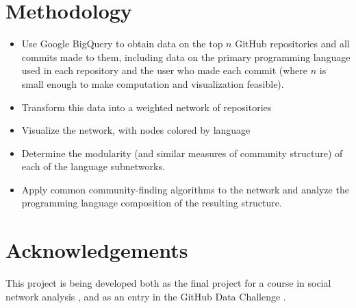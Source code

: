 \documentclass[twocolumn]{article}
\begin{document}
\section*{Methodology}
\begin{itemize}
    \item Use Google BigQuery to obtain data on the top $n$ GitHub repositories
        and all commits made to them, including data on the primary programming
        language used in each repository and the user who made each commit
        (where $n$ is small enough to make computation and visualization
        feasible).
    \item Transform this data into a weighted network of repositories
    \item Visualize the network, with nodes colored by language
    \item Determine the modularity (and similar measures of community structure)
        of each of the language subnetworks.
    \item Apply common community-finding algorithms to the network and analyze
        the programming language composition of the resulting structure.
\end{itemize}

\section*{Acknowledgements}
This project is being developed both as the final project for a course in social
network analysis \cite{snacourse}, and as an entry in the GitHub Data Challenge
\cite{doll13}.




\end{document}
